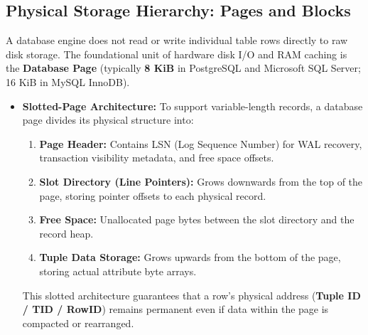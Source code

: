 \subsection{Physical Storage Hierarchy: Pages and Blocks}
A database engine does not read or write individual table rows directly to raw disk storage. The foundational unit of hardware disk I/O and RAM caching is the \textbf{Database Page} (typically \textbf{8 KiB} in PostgreSQL and Microsoft SQL Server; 16 KiB in MySQL InnoDB).
\begin{itemize}
    \item \textbf{Slotted-Page Architecture:} To support variable-length records, a database page divides its physical structure into:
    \begin{enumerate}
        \item \textbf{Page Header:} Contains LSN (Log Sequence Number) for WAL recovery, transaction visibility metadata, and free space offsets.
        \item \textbf{Slot Directory (Line Pointers):} Grows downwards from the top of the page, storing pointer offsets to each physical record.
        \item \textbf{Free Space:} Unallocated page bytes between the slot directory and the record heap.
        \item \textbf{Tuple Data Storage:} Grows upwards from the bottom of the page, storing actual attribute byte arrays.
    \end{enumerate}
    This slotted architecture guarantees that a row's physical address (\textbf{Tuple ID / TID / RowID}) remains permanent even if data within the page is compacted or rearranged.
\end{itemize}

